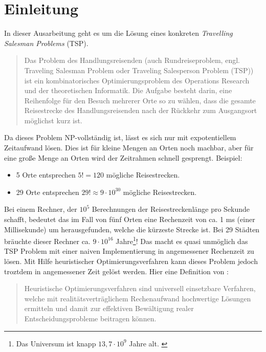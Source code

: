 \section{Einleitung}

In dieser Ausarbeitung geht es um die Lösung eines konkreten
\emph{Travelling Salesman Problems} (TSP).

\begin{quote}
Das Problem des Handlungsreisenden (auch Rundreiseproblem, engl.
Traveling Salesman Problem oder Traveling Salesperson Problem (TSP))
ist ein kombinatorisches Optimierungsproblem des Operations Research und
der theoretischen Informatik. Die Aufgabe besteht darin, eine Reihenfolge
für den Besuch mehrerer Orte so zu wählen, dass die gesamte Reisestrecke
des Handlungsreisenden nach der Rückkehr zum Ausgangsort möglichst
kurz ist. \citep{wikiTsp}
\end{quote}

\noindent Da dieses Problem NP-vollständig ist, lässt es sich nur mit
expotentiellem Zeitaufwand lösen.
Dies ist für kleine Mengen an Orten noch machbar, aber für eine große
Menge an Orten wird der Zeitrahmen schnell gesprengt.
Beispiel:

\begin{itemize}
  \item 5 Orte entsprechen $5! = 120$ mögliche Reisestrecken.
  \item 29 Orte entsprechen $29! ≈ 9 \cdot 10^{30}$ mögliche Reisestrecken.
\end{itemize}

\noindent Bei einem Rechner, der $10^{5}$ Berechnungen der Reisestreckenlänge pro
Sekunde schafft, bedeutet das im Fall von fünf Orten eine Rechenzeit
von ca. 1 ms (einer Millisekunde) um herausgefunden, welche die kürzeste Strecke ist.
Bei 29 Städten bräuchte dieser Rechner ca. $9 \cdot 10^{16}$
Jahre\footnote{Das Universum ist
knapp $13,7 \cdot 10^{9}$ Jahre alt. \citep[siehe][]{wikiUniversum}}!
Das macht es quasi unmöglich das TSP Problem mit einer naiven Implementierung
in angemessener Rechenzeit zu lösen.
Mit Hilfe heuristischer Optimierungsverfahren kann dieses Problem
jedoch troztdem in angemessener Zeit gelöst werden. Hier eine Definition
von \citep{fink}:

\begin{quote}
Heuristische Optimierungsverfahren sind universell einsetzbare Verfahren,
welche mit realitätsverträglichem Rechenaufwand hochwertige Lösungen
ermitteln und damit zur effektiven Bewältigung realer Entscheidungsprobleme
beitragen können. \citep[S.~1]{fink}
\end{quote}


